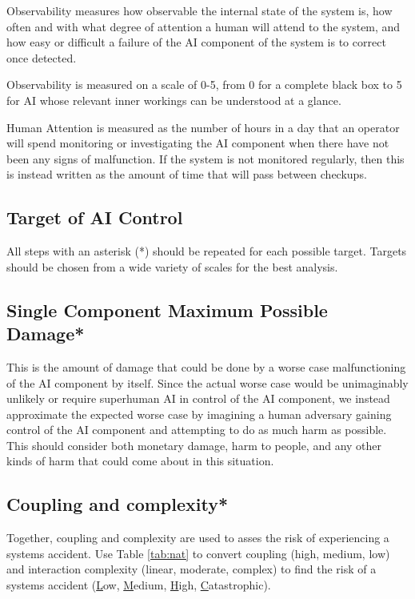 \documentclass[11pt]{article}
\begin{document}
Observability measures how observable the internal state of the system is, how often and with what
degree of attention a human will attend to the system, and how easy or difficult a failure of the AI
component of the system is to correct once detected.

Observability is measured on a scale of 0-5, from 0 for a complete black box to 5 for AI whose
relevant inner workings can be understood at a glance.

Human Attention is measured as the number of hours in a day that an operator will spend monitoring
or investigating the AI component when there have not been any signs of malfunction. If the system
is not monitored regularly, then this is instead written as the amount of time that will pass
between checkups.

\subsection{Target of AI Control}

All steps with an asterisk (*) should be repeated for each possible target. Targets should be chosen from a
wide variety of scales for the best analysis.

\subsection{Single Component Maximum Possible Damage*}

This is the amount of damage that could be done by a worse case malfunctioning of the AI component
by itself. Since the actual worse case would be unimaginably unlikely or require superhuman AI in
control of the AI component, we instead approximate the expected worse case by imagining a human
adversary gaining control of the AI component and attempting to do as much harm as possible. This
should consider both monetary damage, harm to people, and any other kinds of harm that could come
about in this situation.

\subsection{Coupling and complexity*}

Together, coupling and complexity are used to asses the risk of experiencing a systems accident.
Use Table \ref{tab:nat} to convert coupling (high, medium, low) and interaction complexity
(linear, moderate, complex) to find the risk of a systems accident (\underline{L}ow,
\underline{M}edium, \underline{H}igh, \underline{C}atastrophic).
\end{document}
